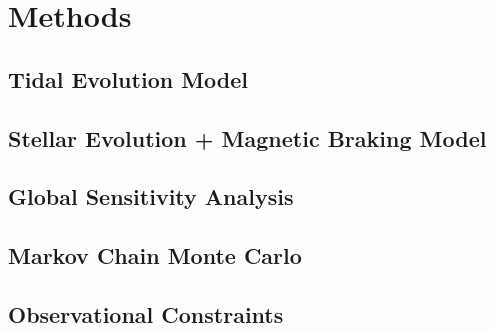 \documentclass[]{aastex631}
\begin{document}
\section{Methods} \label{sec:methods}

\subsection{Tidal Evolution Model}

\subsection{Stellar Evolution + Magnetic Braking Model}

\subsection{Global Sensitivity Analysis}


\subsection{Markov Chain Monte Carlo}



\subsection{Observational Constraints}
\end{document}
